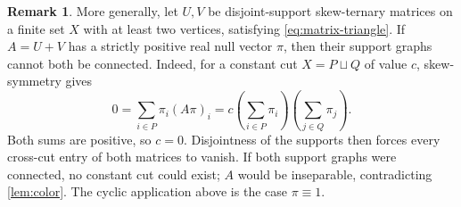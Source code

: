 \documentclass[11pt,a4paper]{amsart}
\numberwithin{equation}{section}
\theoremstyle{plain}
\theoremstyle{definition}
\newtheorem{remark}[theorem]{Remark}
\begin{document}
\begin{remark}\label{rem:positive-equilibrium}
More generally, let \(U,V\) be disjoint-support skew-ternary matrices on
a finite set \(X\) with at least two vertices, satisfying
\eqref{eq:matrix-triangle}.  If \(A=U+V\) has a strictly positive real
null vector \(\pi\), then their support graphs cannot both be connected.
Indeed, for a constant cut \(X=P\sqcup Q\) of value \(c\), skew-symmetry gives
\[
0=\sum_{i\in P}\pi_i(A\pi)_i
=c\left(\sum_{i\in P}\pi_i\right)
  \left(\sum_{j\in Q}\pi_j\right).
\]
Both sums are positive, so \(c=0\).  Disjointness of the supports then
forces every cross-cut entry of both matrices to vanish.  If both support
graphs were connected, no constant cut could exist; \(A\) would be
inseparable, contradicting \cref{lem:color}.  The cyclic application above
is the case \(\pi\equiv1\).
\end{remark}
\end{document}
